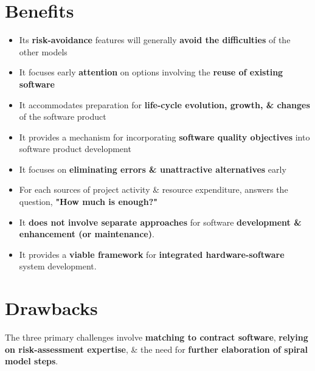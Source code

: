 \documentclass{report}
\begin{document}
\section{Benefits}
\begin{itemize}
  \item Its \textbf{risk-avoidance} features will generally \textbf{avoid the difficulties} of the other models
  \item It focuses early \textbf{attention} on options involving the \textbf{reuse of existing software}
  \item It accommodates preparation for \textbf{life-cycle evolution, growth, \& changes} of the software product
  \item It provides a mechanism for incorporating \textbf{software quality objectives} into software product development
  \item It focuses on \textbf{eliminating errors \& unattractive alternatives} early
  \item For each sources of project activity \& resource expenditure, answers the question, \textbf{"How much is enough?"}
  \item It \textbf{does not involve separate approaches} for software \textbf{development \& enhancement (or maintenance)}.
  \item It provides a \textbf{viable framework} for \textbf{integrated hardware-software} system development.
\end{itemize}

\section{Drawbacks}
\noindent The three primary challenges involve \textbf{matching to contract software}, \textbf{relying on risk-assessment expertise}, \& the need for \textbf{further elaboration of spiral model steps}.
\end{document}
